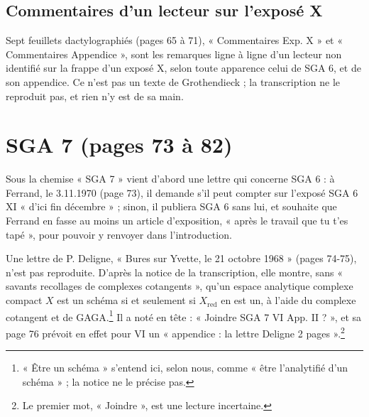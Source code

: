 \documentclass[11pt,a4paper]{article}
\begin{document}
\subsection*{Commentaires d'un lecteur sur l'exposé X}

Sept feuillets dactylographiés (pages 65 à 71), « Commentaires Exp. X » et
« Commentaires Appendice », sont les remarques ligne à ligne d'un lecteur
non identifié sur la frappe d'un exposé X, selon toute apparence celui de
SGA 6, et de son appendice. Ce n'est pas un texte de Grothendieck ; la
transcription ne le reproduit pas, et rien n'y est de sa main.

\section*{SGA 7 (pages 73 à 82)}

Sous la chemise « SGA 7 » vient d'abord une lettre qui concerne SGA 6 : à
Ferrand, le 3.11.1970 (page 73), il demande s'il peut compter sur l'exposé
SGA 6 XI « d'ici fin décembre » ; sinon, il publiera SGA 6 sans lui, et
souhaite que Ferrand en fasse au moins un article d'exposition, « après le
travail que tu t'es tapé », pour pouvoir y renvoyer dans l'introduction.

Une lettre de P. Deligne, « Bures sur Yvette, le 21 octobre 1968 » (pages
74-75), n'est pas reproduite. D'après la notice de la transcription, elle
montre, sans « savants recollages de complexes cotangents », qu'un espace
analytique complexe compact $X$ est un schéma si et seulement si
$X_{\mathrm{red}}$ en est un, à l'aide du complexe cotangent et de
GAGA.\footnote{« Être un schéma » s'entend ici, selon nous, comme « être
l'analytifié d'un schéma » ; la notice ne le précise pas.}
Il a noté en tête : « Joindre SGA 7 VI App. II ? », et sa page 76 prévoit en
effet pour VI un « appendice : la lettre Deligne 2 pages ».\footnote{Le
premier mot, « Joindre », est une lecture incertaine.}
\end{document}
